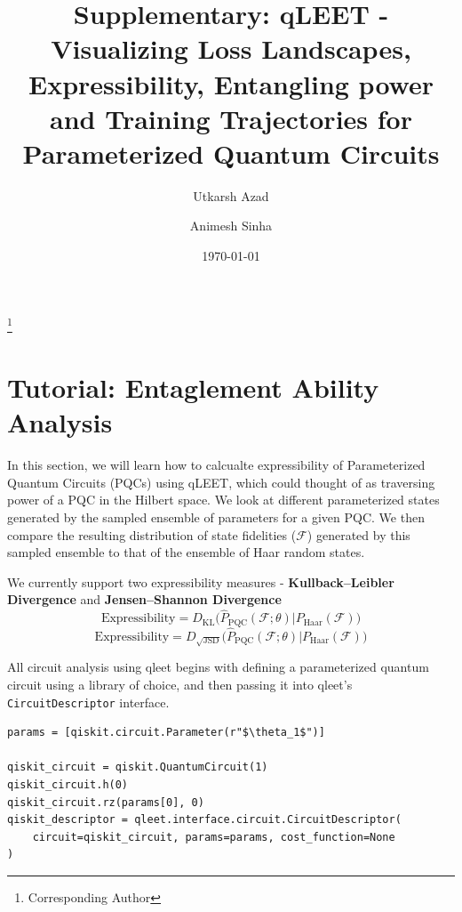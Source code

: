 \documentclass[%
 reprint,
 amsmath,
 amssymb,
 showkeys,
 pra,
 floatfix,
 onecolumn,
]{revtex4-2}
\begin{document}
\title{Supplementary: qLEET - Visualizing Loss Landscapes, Expressibility, Entangling power and Training Trajectories for Parameterized Quantum Circuits}

\author{Utkarsh Azad}
\thanks{Corresponding Author}
\author{Animesh Sinha}
\date{\today}

\maketitle

\section{\label{sec:supl-expressibility-tutorial}Tutorial: Entaglement Ability Analysis}

In this section, we will learn how to calcualte expressibility of Parameterized Quantum Circuits (PQCs) using qLEET, which could thought of as traversing power of a PQC in the Hilbert space. We look at different parameterized states generated by the sampled ensemble of parameters for a given PQC. We then compare the resulting distribution of state fidelities ($\mathcal{F}$) generated by this sampled ensemble to that of the ensemble of Haar random states.

We currently support two expressibility measures - \textbf{Kullback–Leibler Divergence} and \textbf{Jensen–Shannon Divergence}
$$ \textrm{Expressibility} = D_{\textrm{KL}} \Big( \hat{P}_{\textrm{PQC}}(\mathcal{F}; \theta) \big\vert P_{\textrm{Haar}}(\mathcal{F}) \Big) $$
$$ \textrm{Expressibility} = D_{\sqrt{\textrm{JSD}}} \Big( \hat{P}_{\textrm{PQC}}(\mathcal{F}; \theta) \big\vert P_{\textrm{Haar}}(\mathcal{F}) \Big) $$

All circuit analysis using qleet begins with defining a parameterized quantum circuit using a library of choice, and then passing it into qleet's \lstinline{CircuitDescriptor} interface.

\begin{lstlisting}
params = [qiskit.circuit.Parameter(r"$\theta_1$")]

qiskit_circuit = qiskit.QuantumCircuit(1)
qiskit_circuit.h(0)
qiskit_circuit.rz(params[0], 0)
qiskit_descriptor = qleet.interface.circuit.CircuitDescriptor(
    circuit=qiskit_circuit, params=params, cost_function=None
)
\end{lstlisting}
\end{document}
